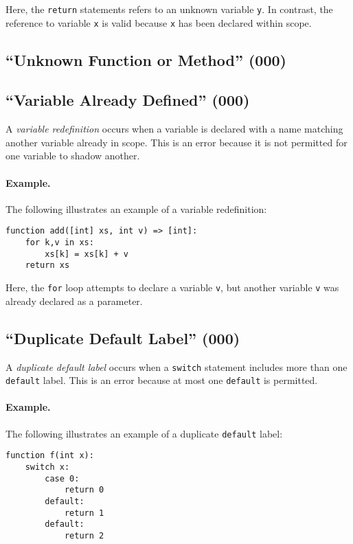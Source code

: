 Here, the \lstinline{return} statements refers to an unknown variable \lstinline{y}.  In contrast, the reference to variable \lstinline{x} is valid because \lstinline{x} has been declared within scope.

\subsection{``Unknown Function or Method'' (000)}

\subsection{``Variable Already Defined'' (000)}

A {\em variable redefinition} occurs when a variable is declared with a name matching another variable already in scope.  This is an error because it is not permitted for one variable to shadow another.

\paragraph{Example.}  The following illustrates an example of a variable redefinition:

\begin{lstlisting}
function add([int] xs, int v) => [int]:
    for k,v in xs:
        xs[k] = xs[k] + v
    return xs
\end{lstlisting}

Here, the \lstinline{for} loop attempts to declare a variable \lstinline{v}, but another variable \lstinline{v} was already declared as a parameter.

\subsection{``Duplicate Default Label'' (000)}
A {\em duplicate default label} occurs when a \lstinline{switch} statement includes more than one \lstinline{default} label.  This is an error because at most one \lstinline{default} is permitted.

\paragraph{Example.}  The following illustrates an example of a duplicate \lstinline{default} label:

\begin{lstlisting}
function f(int x):
    switch x:
        case 0:
            return 0
        default:
            return 1
        default:
            return 2
\end{lstlisting}

